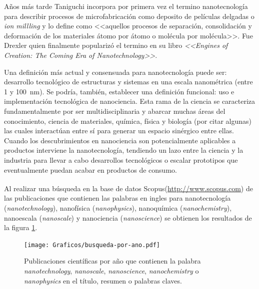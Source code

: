 	Años más tarde Taniguchi incorpora por primera vez el termino nanotecnología para describir procesos de microfabricación como deposito de películas delgadas o \textit{ion millling} y lo define como <<aquellos procesos de separación, consolidación y deformación de los materiales átomo por átomo o molécula por molécula>>. \cite{taniguchi1974} Fue Drexler quien finalmente popularizó el termino en su libro \textit{<<Engines of Creation: The Coming Era of Nanotechnology>>}\cite{drexler1987}. 

	Una definición más actual y consensuada para nanotecnología puede ser: desarrollo tecnológico de estructuras y sistemas en una escala nanométrica (entre 1 y \SI{100}{\nm}). Se podría, también, establecer una definición funcional: uso e implementación tecnológica de nanociencia. Esta rama de la ciencia se caracteriza fundamentalmente por ser multidisciplinaria y abarcar muchas áreas del conocimiento, ciencia de materiales, química, física y biología (por citar algunas) las cuales interactúan entre sí para generar un espacio sinérgico entre ellas. Cuando los descubrimientos en nanociencia son potencialmente aplicables a productos interviene la nanotecnología, tendiendo un lazo entre la ciencia y la industria para llevar a cabo desarrollos tecnológicos o escalar prototipos que eventualmente puedan acabar en productos de consumo.
	
	Al realizar una búsqueda en la base de datos Scopus\textsuperscript\textregistered (\url{http://www.scopus.com}) de las publicaciones que contienen las palabras en ingles para nanotecnología (\textit{nanotechnology}), nanofísica (\textit{nanophysics}), nanoquímica (\textit{nanochemistry}), nanoescala (\textit{nanoscale}) y nanociencia (\textit{nanoscience}) se obtienen los resultados de la figura \ref{fig:publicaciones-ano}. 

			\vspace*{-0.7cm}
 			\begin{figure}[ht!]
 			\begin{center}
 			\texttt{[image: Graficos/busqueda-por-ano.pdf]}
 			\vspace*{-0.4cm}
 			\caption[Publicaciones por año en nanotecnología]{Publicaciones científicas por año que contienen la palabra \textit{nanotechnology}, \textit{nanoscale}, \textit{nanoscience}, \textit{nanochemistry} o \textit{nanophysics} en el título, resumen o palabras claves.}
 			\label{fig:publicaciones-ano} 		    
 			\end{center}
 		    \end{figure}
	
